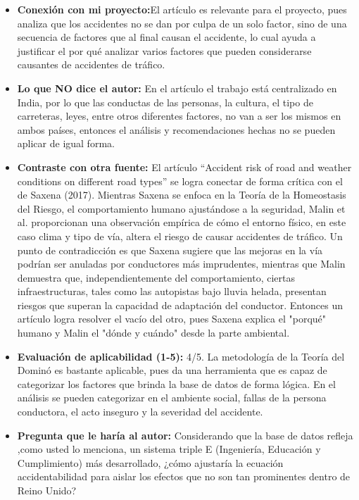 \documentclass[12pt]{article}
\begin{document}
\begin{itemize}
    \item \textbf{Conexión con mi proyecto:}El artículo es relevante para el proyecto, pues analiza que los accidentes no se dan por culpa de un solo factor, sino de una secuencia de factores que al final causan el accidente, lo cual ayuda a justificar el por qué analizar varios factores que pueden considerarse causantes de accidentes de tráfico.
    
	\item \textbf{Lo que NO dice el autor:} En el artículo el trabajo está centralizado en India, por lo que las conductas de las personas, la cultura, el tipo de carreteras, leyes, entre otros diferentes factores, no van a ser los mismos en ambos países, entonces el análisis y recomendaciones hechas no se pueden aplicar de igual forma.
    
	\item \textbf{Contraste con otra fuente:} El artículo “Accident risk of road and weather conditions on different road types” se logra conectar de forma crítica con el de Saxena (2017). Mientras Saxena se enfoca en la Teoría de la Homeostasis del Riesgo, el comportamiento humano ajustándose a la seguridad, Malin et al. proporcionan una observación empírica de cómo el entorno físico, en este caso clima y tipo de vía,  altera el riesgo de causar accidentes de tráfico. Un punto de contradicción es que Saxena sugiere que las mejoras en la vía podrían ser anuladas por conductores más imprudentes, mientras que Malin demuestra que, independientemente del comportamiento, ciertas infraestructuras, tales como las autopistas bajo lluvia helada, presentan riesgos que superan la capacidad de adaptación del conductor. Entonces un artículo logra resolver el vacío del otro, pues Saxena explica el "porqué" humano y Malin el "dónde y cuándo" desde la parte ambiental.
    
	\item \textbf{Evaluación de aplicabilidad (1-5):} 4/5. La metodología de la Teoría del Dominó es bastante aplicable, pues da una herramienta que es capaz de categorizar los factores que brinda la base de datos de forma lógica. En el análisis se pueden categorizar en el ambiente social, fallas de la persona conductora, el acto inseguro y la severidad del accidente.
    
	\item \textbf{Pregunta que le haría al autor:} Considerando que la base de datos refleja ,como usted lo menciona, un sistema triple E (Ingeniería, Educación y Cumplimiento)  más desarrollado, ¿cómo ajustaría la ecuación accidentabilidad para aislar los efectos que no son tan prominentes dentro de Reino Unido?
    

\end{itemize}
\end{document}
